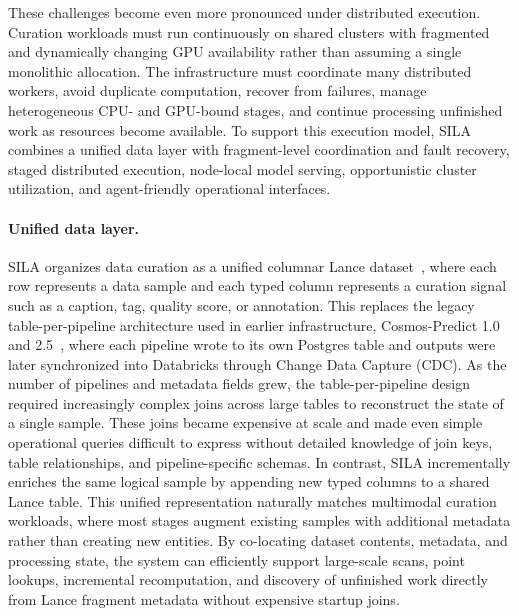These challenges become even more pronounced under distributed execution. Curation workloads must run continuously on shared clusters with fragmented and dynamically changing GPU availability rather than assuming a single monolithic allocation. The infrastructure must coordinate many distributed workers, avoid duplicate computation, recover from failures, manage heterogeneous CPU- and GPU-bound stages, and continue processing unfinished work as resources become available. To support this execution model, SILA combines a unified data layer with fragment-level coordination and fault recovery, staged distributed execution, node-local model serving, opportunistic cluster utilization, and agent-friendly operational interfaces.

\paragraph{Unified data layer.}
SILA organizes data curation as a unified columnar Lance dataset~\citep{pace2025lance}, where each row represents a data sample and each typed column represents a curation signal such as a caption, tag, quality score, or annotation. This replaces the legacy table-per-pipeline architecture used in earlier infrastructure, Cosmos-Predict 1.0~\citep{cosmos_v1} and 2.5~\citep{cosmos_predict2p5}, where each pipeline wrote to its own Postgres table and outputs were later synchronized into Databricks through Change Data Capture (CDC). As the number of pipelines and metadata fields grew, the table-per-pipeline design required increasingly complex joins across large tables to reconstruct the state of a single sample. These joins became expensive at scale and made even simple operational queries difficult to express without detailed knowledge of join keys, table relationships, and pipeline-specific schemas. In contrast, SILA incrementally enriches the same logical sample by appending new typed columns to a shared Lance table. This unified representation naturally matches multimodal curation workloads, where most stages augment existing samples with additional metadata rather than creating new entities. By co-locating dataset contents, metadata, and processing state, the system can efficiently support large-scale scans, point lookups, incremental recomputation, and discovery of unfinished work directly from Lance fragment metadata without expensive startup joins.


